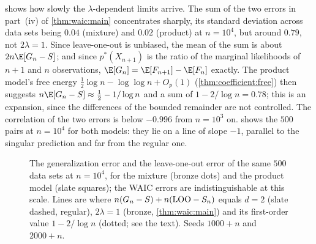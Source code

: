 \begin{refsection}
 shows how slowly the $\lambda$-dependent limits arrive. The sum of the two errors in part~(iv) of \cref{thm:waic:main} concentrates sharply, its standard deviation across data sets being $0.04$ (mixture) and $0.02$ (product) at $n=10^4$, but around $0.79$, not $2\lambda=1$. Since leave-one-out is unbiased, the mean of the sum is about $2n\E[G_n-S]$; and since $p^*(X_{n+1})$ is the ratio of the marginal likelihoods of $n+1$ and $n$ observations, $\E[G_n]=\E[F_{n+1}]-\E[F_n]$ exactly. The product model's free energy $\tfrac12\log n-\log\log n+O_p(1)$ (\cref{thm:coefficient:free}) then suggests $n\E[G_n-S]\approx\tfrac12-1/\log n$ and a sum of $1-2/\log n=0.78$; this is an expansion, since the differences of the bounded remainder are not controlled. The correlation of the two errors is below $-0.996$ from $n=10^3$ on.  shows the $500$ pairs at $n=10^4$ for both models: they lie on a line of slope $-1$, parallel to the singular prediction and far from the regular one.

\begin{figure}[t]
\centering
{}
\caption{The generalization error and the leave-one-out error of the same $500$ data sets at $n=10^4$, for the mixture (bronze dots) and the product model (slate squares); the WAIC errors are indistinguishable at this scale. Lines are where $n(G_n-S)+n(\mathrm{LOO}-S_n)$ equals $d=2$ (slate dashed, regular), $2\lambda=1$ (bronze, \cref{thm:waic:main}) and its first-order value $1-2/\log n$ (dotted; see the text). Seeds $1000+n$ and $2000+n$.}\label{fig:waic:scatter}
\end{figure}


\end{refsection}

